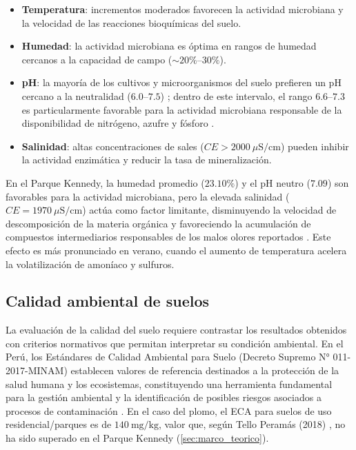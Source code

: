 \documentclass[fleqn]{jaes}
\begin{document}
\begin{itemize}
  \item \textbf{Temperatura}: incrementos moderados favorecen la actividad microbiana y la velocidad de las reacciones bioquímicas del suelo.
  \item \textbf{Humedad}: la actividad microbiana es óptima en rangos de humedad cercanos a la capacidad de campo ($\sim 20\%$--$30\%$).
  \item \textbf{pH}: la mayoría de los cultivos y microorganismos del suelo prefieren un pH cercano a la neutralidad ($6.0$--$7.5$) \cite{USDANRCS1998}; dentro de este intervalo, el rango $6.6$--$7.3$ es particularmente favorable para la actividad microbiana responsable de la disponibilidad de nitrógeno, azufre y fósforo \cite{USDANRCS1998, PortaCasanellas1994}.
  \item \textbf{Salinidad}: altas concentraciones de sales ($CE > 2000~\mu\text{S/cm}$) pueden inhibir la actividad enzimática y reducir la tasa de mineralización.
\end{itemize}

En el Parque Kennedy, la humedad promedio ($23.10\%$) y el pH neutro ($7.09$) son favorables para la actividad microbiana, pero la elevada salinidad ($CE = 1970~\mu\text{S/cm}$) actúa como factor limitante, disminuyendo la velocidad de descomposición de la materia orgánica y favoreciendo la acumulación de compuestos intermediarios responsables de los malos olores reportados \cite{Rath2015}. Este efecto es más pronunciado en verano, cuando el aumento de temperatura acelera la volatilización de amoníaco y sulfuros.

\subsection{Calidad ambiental de suelos}

La evaluación de la calidad del suelo requiere contrastar los resultados obtenidos con criterios normativos que permitan interpretar su condición ambiental. En el Perú, los Estándares de Calidad Ambiental para Suelo (Decreto Supremo N° 011-2017-MINAM) establecen valores de referencia destinados a la protección de la salud humana y los ecosistemas, constituyendo una herramienta fundamental para la gestión ambiental y la identificación de posibles riesgos asociados a procesos de contaminación \cite{MinisteriodelAmbiente2017}. En el caso del plomo, el ECA para suelos de uso residencial/parques es de $140~\text{mg/kg}$, valor que, según Tello Peramás (2018) \cite{TelloPerams2018}, no ha sido superado en el Parque Kennedy (\cref{sec:marco_teorico}).
\end{document}
